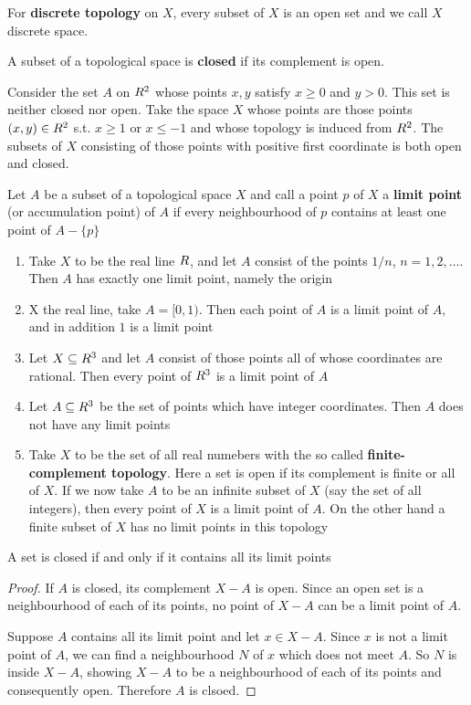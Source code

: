 \documentclass[11pt]{article}
\begin{document}
For \textbf{discrete topology} on \(X\), every subset of \(X\) is an open set and we
call \(X\) discrete space.

A subset of a topological space is \textbf{closed} if its complement is open.

Consider the set \(A\) on \(\relax{R}^2\) whose points \(x,y\) satisfy \(x\ge0\) and
\(y>0\). This set is neither closed nor open. Take the space \(X\) whose
points are those points \((x,y)\in\relax{R}^2\) s.t. \(x\ge1\) or \(x\le-1\) and
whose topology is induced from \(\relax{R}^2\). The subsets of \(X\) consisting of
those points with positive first coordinate is both open and closed.

Let \(A\) be a subset of a topological space \(X\) and call a point \(p\) of
\(X\) a \textbf{limit point} (or accumulation point) of \(A\) if every neighbourhood
of \(p\) contains at least one point of \(A-\{p\}\)

\begin{examplle}[]
\begin{enumerate}
\item Take \(X\) to be the real line \(\relax{R}\), and let \(A\) consist of the points
\(1/n\), \(n=1,2,\dots\). Then \(A\) has exactly one limit point, namely
the origin
\item X the real line, take \(A=[0,1)\). Then each point of \(A\) is a limit
point of \(A\), and in addition \(1\) is a limit point
\item Let \(X\subseteq\relax{R}^3\) and let \(A\) consist of those points all of whose
coordinates are rational. Then every point of \(\relax{R}^3\) is a limit point of \(A\)
\item Let \(A\subseteq\relax{R}^3\) be the set of points which have integer
coordinates. Then \(A\) does not have any limit points
\item Take \(X\) to be the set of all real numebers with the so called
\textbf{finite-complement topology}. Here a set is open if its complement is
finite or all of \(X\). If we now take \(A\) to be an infinite subset of
\(X\) (say the set of all integers), then every point of \(X\) is a limit
point of \(A\). On the other hand a finite subset of \(X\) has no limit
points in this topology
\end{enumerate}
\end{examplle}

\begin{theorem}[]
A set is closed if and only if it contains all its limit points
\end{theorem}

\begin{proof}
If \(A\) is closed, its complement \(X-A\) is open. Since an open set is a
neighbourhood of each of its points, no point of \(X-A\) can be a limit point
of \(A\).

Suppose \(A\) contains all its limit point and let \(x\in X-A\). Since \(x\)
is not a limit point of \(A\), we can find a neighbourhood \(N\) of \(x\)
which does not meet \(A\). So \(N\) is inside \(X-A\), showing \(X-A\) to be
a neighbourhood of each of its points and consequently open. Therefore \(A\)
is clsoed.
\end{proof}
\end{document}
